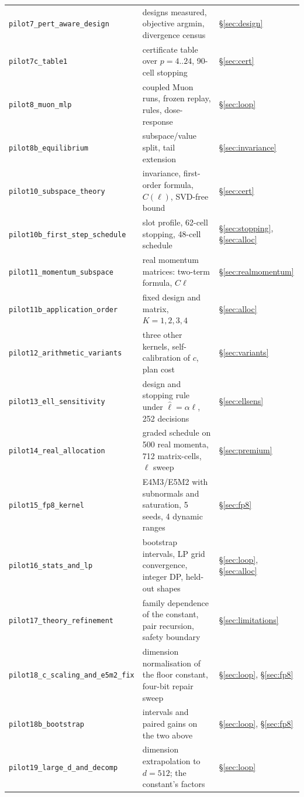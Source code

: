 \begin{table}[h]
\begin{tabular}{>{\raggedright\arraybackslash}p{5.6cm}
                >{\raggedright\arraybackslash}p{6.3cm}
                >{\raggedright\arraybackslash}p{3.4cm}}
\texttt{pilot7\_pert\_aware\_design} & 37 designs measured, objective argmin, divergence census & \S\ref{sec:design} \\
\texttt{pilot7c\_table1} & certificate table over $p=4..24$, 90-cell stopping & \S\ref{sec:cert} \\
\texttt{pilot8\_muon\_mlp} & coupled Muon runs, frozen replay, rules, dose-response & \S\ref{sec:loop} \\
\texttt{pilot8b\_equilibrium} & subspace/value split, tail extension & \S\ref{sec:invariance} \\
\texttt{pilot10\_subspace\_theory} & invariance, first-order formula, $C(\ell)$, SVD-free bound & \S\ref{sec:cert} \\
\texttt{pilot10b\_first\_step\_schedule} & slot profile, 62-cell stopping, 48-cell schedule & \S\ref{sec:stopping}, \S\ref{sec:alloc} \\
\texttt{pilot11\_momentum\_subspace} & 500 real momentum matrices: two-term formula, $C\ell$ & \S\ref{sec:realmomentum} \\
\texttt{pilot11b\_application\_order} & fixed design and matrix, $K=1,2,3,4$ & \S\ref{sec:alloc} \\
\texttt{pilot12\_arithmetic\_variants} & three other kernels, self-calibration of $c$, plan cost & \S\ref{sec:variants} \\
\texttt{pilot13\_ell\_sensitivity} & design and stopping rule under $\hat\ell=\alpha\ell$, 252 decisions & \S\ref{sec:ellsens} \\
\texttt{pilot14\_real\_allocation} & graded schedule on 500 real momenta, 712 matrix-cells, $\ell$ sweep & \S\ref{sec:premium} \\
\texttt{pilot15\_fp8\_kernel} & E4M3/E5M2 with subnormals and saturation, 5 seeds, 4 dynamic ranges & \S\ref{sec:fp8} \\
\texttt{pilot16\_stats\_and\_lp} & bootstrap intervals, LP grid convergence, integer DP, held-out shapes & \S\ref{sec:loop}, \S\ref{sec:alloc} \\
\texttt{pilot17\_theory\_refinement} & family dependence of the constant, pair recursion, safety boundary & \S\ref{sec:limitations} \\
\texttt{pilot18\_c\_scaling\_and\_e5m2\_fix} & dimension normalisation of the floor constant, four-bit repair sweep & \S\ref{sec:loop}, \S\ref{sec:fp8} \\
\texttt{pilot18b\_bootstrap} & intervals and paired gains on the two above & \S\ref{sec:loop}, \S\ref{sec:fp8} \\
\texttt{pilot19\_large\_d\_and\_decomp} & dimension extrapolation to $d=512$; the constant's factors & \S\ref{sec:loop} \\

\end{tabular}
\end{table}
